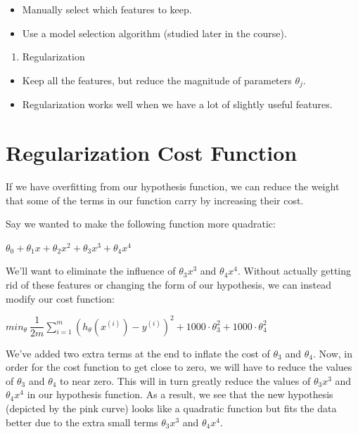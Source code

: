 \documentclass[
]{book}
\providecommand{\tightlist}{%
  \setlength{\itemsep}{0pt}\setlength{\parskip}{0pt}}
\begin{document}
\begin{itemize}
\tightlist
\item
  Manually select which features to keep.
\item
  Use a model selection algorithm (studied later in the course).
\end{itemize}

\begin{enumerate}
\def\labelenumi{\arabic{enumi})}
\setcounter{enumi}{1}
\tightlist
\item
  Regularization
\end{enumerate}

\begin{itemize}
\tightlist
\item
  Keep all the features, but reduce the magnitude of parameters \(\theta_j\).
\item
  Regularization works well when we have a lot of slightly useful features.
\end{itemize}

\hypertarget{regularization-cost-function}{%
\section{Regularization Cost Function}\label{regularization-cost-function}}

If we have overfitting from our hypothesis function, we can reduce the weight that some of the terms in our function carry by increasing their cost.

Say we wanted to make the following function more quadratic:

\(\theta_0 + \theta_1x + \theta_2x^2 + \theta_3x^3 + \theta_4x^4\)

We'll want to eliminate the influence of \(\theta_3x^3\) and \(\theta_4x^4\). Without actually getting rid of these features or changing the form of our hypothesis, we can instead modify our cost function:

\(min_\theta\ \dfrac{1}{2m}\sum_{i=1}^m (h_\theta(x^{(i)}) - y^{(i)})^2 + 1000\cdot\theta_3^2 + 1000\cdot\theta_4^2\)

We've added two extra terms at the end to inflate the cost of \(\theta_3\) and \(\theta_4\). Now, in order for the cost function to get close to zero, we will have to reduce the values of \(\theta_3\) and \(\theta_4\) to near zero. This will in turn greatly reduce the values of \(\theta_3x^3\) and \(\theta_4x^4\) in our hypothesis function. As a result, we see that the new hypothesis (depicted by the pink curve) looks like a quadratic function but fits the data better due to the extra small terms \(\theta_3x^3\) and \(\theta_4x^4\).
\end{document}
